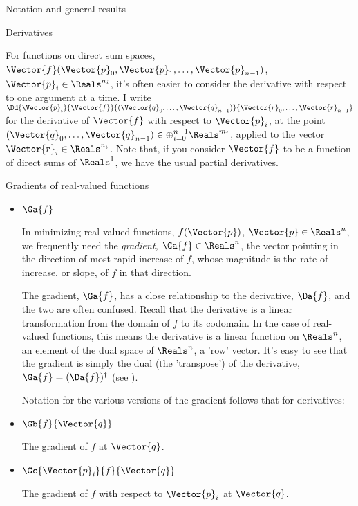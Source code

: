 \begin{plSection}{Notation and general results}
\begin{plSection}{Derivatives}
\begin{itemize}
For functions on direct sum spaces,
$\Vector{f}(\Vector{p}_0,\Vector{p}_1,\ldots,\Vector{p}_{n-1})$, $\Vector{p}_i \in \Reals^{n_i}$,
it's often easier to consider the derivative
with respect to one argument at a time.
I write $\Dd{\Vector{p}_i}{\Vector{f}}{(\Vector{q}_0,\ldots,\Vector{q}_{n-1})}{\Vector{r}_0,\ldots,\Vector{r}_{n-1}}$
for the derivative of $\Vector{f}$ with respect to $\Vector{p}_i$,
at the point $(\Vector{q}_0,\ldots,\Vector{q}_{n-1}) \in \oplus_{i=0}^{n-1} \Reals^{m_i}$,
applied to the vector $\Vector{r}_i \in \Reals^{n_i}$.
Note that, if you consider $\Vector{f}$ to be a function
of direct sums of $\Reals^1$, we have the usual
partial derivatives.

\end{itemize}

\begin{plSection}{Gradients of real-valued functions}
\label{sec:gradients}

\begin{itemize}

\item $\Ga{f}$

In minimizing real-valued functions, $f(\Vector{p})$, $\Vector{p} \in \Reals^n$,
we frequently need
the {\it gradient,} $\Ga{f} \in \Reals^n$,
the vector pointing in the direction of most rapid increase of $f$,
whose magnitude is the rate of increase, or slope,
of $f$ in that direction.

The gradient, $\Ga{f}$,
has a close relationship to the derivative, $\Da{f}$,
and the two are often confused.
Recall that the derivative is a linear transformation
from the domain of $f$ to its codomain.
In the case of real-valued functions,
this means the derivative is a linear function on $\Reals^n$,
an element of the dual space of $\Reals^n$, a 'row' vector.
It's easy to see that the gradient is simply the dual (the 'transpose')
of the derivative, $\Ga{f} = (\Da{f})^{\dagger}$
(see ).

Notation for the various versions of the gradient
follows that for derivatives:

\item $\Gb{f}{\Vector{q}}$

The gradient of $f$ at $\Vector{q}$.

\item $\Gc{\Vector{p}_i}{f}{\Vector{q}}$

The gradient of $f$
with respect to $\Vector{p}_i$ at $\Vector{q}$.


\end{itemize}
\end{plSection}
\end{plSection}
\end{plSection}
